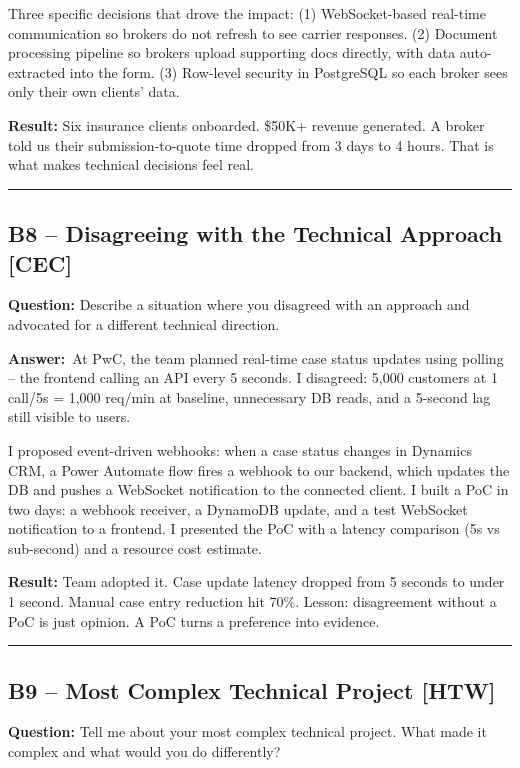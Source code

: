 \documentclass[letterpaper,10pt]{article}
\newlength{\boxwidth}
\newcommand{\bquestionbox}[1]{%
  \vspace{6pt}%
  \noindent\colorbox{bqbg}{%
    \begin{minipage}{\boxwidth}%
      \vspace{3pt}\textbf{\textcolor{orange!70!black}{Question:}} #1\vspace{3pt}%
    \end{minipage}%
  }\vspace{2pt}%
}
\newcommand{\answerlabel}{\noindent\textbf{\textcolor{answerblue}{Answer:}}~}
\begin{document}
Three specific decisions that drove the impact: (1) WebSocket-based real-time communication so brokers do not refresh to see carrier responses. (2) Document processing pipeline so brokers upload supporting docs directly, with data auto-extracted into the form. (3) Row-level security in PostgreSQL so each broker sees only their own clients' data.

\textbf{Result:} Six insurance clients onboarded. \$50K+ revenue generated. A broker told us their submission-to-quote time dropped from 3 days to 4 hours. That is what makes technical decisions feel real.

\rule{\linewidth}{0.2pt}

\subsection*{B8 -- Disagreeing with the Technical Approach \textmd{[CEC]}}

\bquestionbox{Describe a situation where you disagreed with an approach and advocated for a different technical direction.}

\answerlabel At PwC, the team planned real-time case status updates using polling -- the frontend calling an API every 5 seconds. I disagreed: 5,000 customers at 1 call/5s = 1,000 req/min at baseline, unnecessary DB reads, and a 5-second lag still visible to users.

I proposed event-driven webhooks: when a case status changes in Dynamics CRM, a Power Automate flow fires a webhook to our backend, which updates the DB and pushes a WebSocket notification to the connected client. I built a PoC in two days: a webhook receiver, a DynamoDB update, and a test WebSocket notification to a frontend. I presented the PoC with a latency comparison (5s vs sub-second) and a resource cost estimate.

\textbf{Result:} Team adopted it. Case update latency dropped from 5 seconds to under 1 second. Manual case entry reduction hit 70\%. Lesson: disagreement without a PoC is just opinion. A PoC turns a preference into evidence.

\rule{\linewidth}{0.2pt}

\subsection*{B9 -- Most Complex Technical Project \textmd{[HTW]}}

\bquestionbox{Tell me about your most complex technical project. What made it complex and what would you do differently?}
\end{document}
